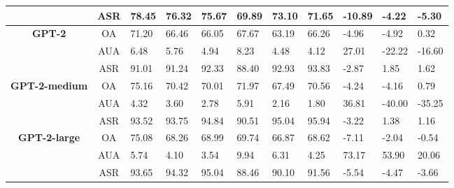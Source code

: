 \documentclass{article}
\begin{document}
\begin{table}[ht]
\begin{tabular}{c|c|p{0.6cm}p{0.6cm}p{0.6cm}|p{1cm}p{1cm}p{1cm}|p{1cm}p{1cm}p{1cm}}
& ASR & 78.45 & 76.32 & 75.67 & 69.89 & 73.10 & 71.65 & -10.89 & -4.22 & -5.30 \\ \hline
\multirow{3}{*}{\textbf{GPT-2}}        & OA   & 71.20 & 66.46 & 66.05 & 67.67 & 63.19 & 66.26 & -4.96  & -4.92 & 0.32  \\
                                      & AUA  & 6.48  & 5.76  & 4.94  & 8.23  & 4.48  & 4.12  & 27.01  & -22.22 & -16.60 \\
                                      & ASR  & 91.01 & 91.24 & 92.33 & 88.40 & 92.93 & 93.83 & -2.87  & 1.85  & 1.62  \\ \hline
\multirow{3}{*}{\textbf{GPT-2-medium}}        & OA   & 75.16  & 70.42 & 70.01 & 71.97 & 67.49 & 70.56 & -4.24 & -4.16 & 0.79 \\ 
& AUA  & 4.32   & 3.60  & 2.78  & 5.91  & 2.16  & 1.80  & 36.81 & -40.00 & -35.25 \\ 
& ASR  & 93.52  & 93.75 & 94.84 & 90.51 & 95.04 & 95.94 & -3.22 & 1.38  & 1.16  \\ \hline
\multirow{3}{*}{\textbf{GPT-2-large}}        & OA   & 75.08  & 68.26 & 68.99 & 69.74 & 66.87 & 68.62 & -7.11 & -2.04 & -0.54 \\ 
& AUA  & 5.74   & 4.10  & 3.54  & 9.94  & 6.31  & 4.25  & 73.17 & 53.90 & 20.06 \\ 
& ASR  & 93.65  & 94.32 & 95.04 & 88.46 & 90.10 & 91.56 & -5.54 & -4.47 & -3.66 \\ \hline


\end{tabular}
\end{table}
\end{document}
